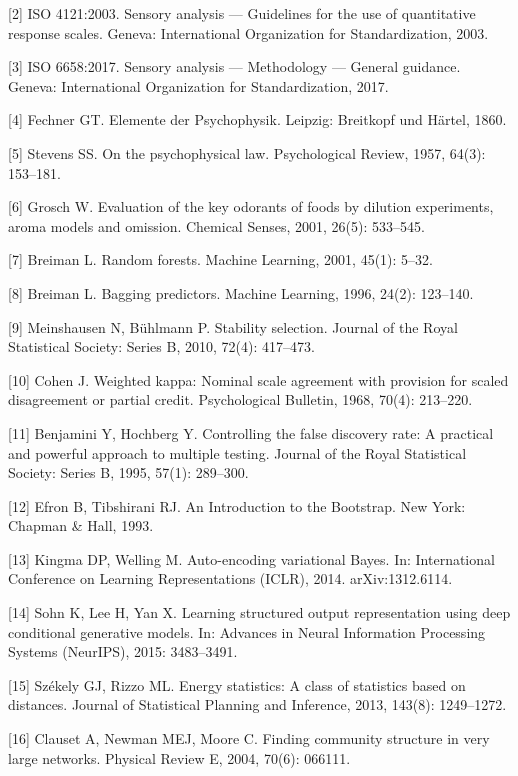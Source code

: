 \documentclass[
  a4paper,12pt]{article}
\begin{document}
{[}2{]} ISO 4121:2003. Sensory analysis --- Guidelines for the use of
quantitative response scales. Geneva: International Organization for
Standardization, 2003.

{[}3{]} ISO 6658:2017. Sensory analysis --- Methodology --- General
guidance. Geneva: International Organization for Standardization, 2017.

{[}4{]} Fechner GT. Elemente der Psychophysik. Leipzig: Breitkopf und
Härtel, 1860.

{[}5{]} Stevens SS. On the psychophysical law. Psychological Review,
1957, 64(3): 153--181.

{[}6{]} Grosch W. Evaluation of the key odorants of foods by dilution
experiments, aroma models and omission. Chemical Senses, 2001, 26(5):
533--545.

{[}7{]} Breiman L. Random forests. Machine Learning, 2001, 45(1): 5--32.

{[}8{]} Breiman L. Bagging predictors. Machine Learning, 1996, 24(2):
123--140.

{[}9{]} Meinshausen N, Bühlmann P. Stability selection. Journal of the
Royal Statistical Society: Series B, 2010, 72(4): 417--473.

{[}10{]} Cohen J. Weighted kappa: Nominal scale agreement with provision
for scaled disagreement or partial credit. Psychological Bulletin, 1968,
70(4): 213--220.

{[}11{]} Benjamini Y, Hochberg Y. Controlling the false discovery rate:
A practical and powerful approach to multiple testing. Journal of the
Royal Statistical Society: Series B, 1995, 57(1): 289--300.

{[}12{]} Efron B, Tibshirani RJ. An Introduction to the Bootstrap. New
York: Chapman \& Hall, 1993.

{[}13{]} Kingma DP, Welling M. Auto-encoding variational Bayes. In:
International Conference on Learning Representations (ICLR), 2014.
arXiv:1312.6114.

{[}14{]} Sohn K, Lee H, Yan X. Learning structured output representation
using deep conditional generative models. In: Advances in Neural
Information Processing Systems (NeurIPS), 2015: 3483--3491.

{[}15{]} Székely GJ, Rizzo ML. Energy statistics: A class of statistics
based on distances. Journal of Statistical Planning and Inference, 2013,
143(8): 1249--1272.

{[}16{]} Clauset A, Newman MEJ, Moore C. Finding community structure in
very large networks. Physical Review E, 2004, 70(6): 066111.
\end{document}
